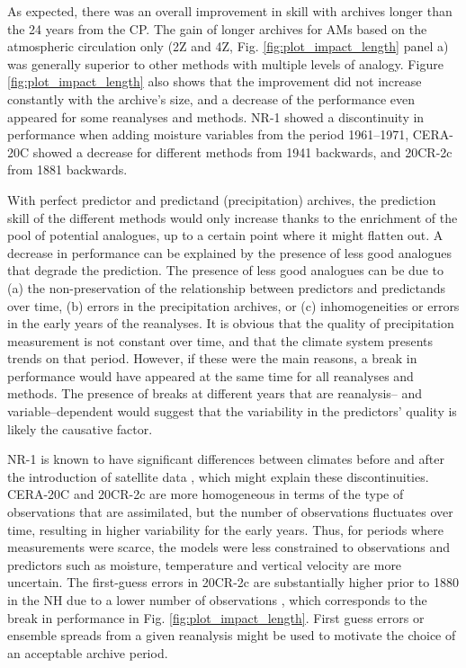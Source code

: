 \documentclass[smallextended]{svjour3}       %
\begin{document}
	As expected, there was an overall improvement in skill with archives longer than the 24 years from the CP. The gain of longer archives for AMs based on the atmospheric circulation only (2Z and 4Z, Fig. \ref{fig:plot_impact_length} panel a) was generally superior to other methods with multiple levels of analogy. Figure \ref{fig:plot_impact_length} also shows that the improvement did not increase constantly with the archive's size, and a decrease of the performance even appeared for some reanalyses and methods. NR-1 showed a discontinuity in performance when adding moisture variables from the period 1961--1971, CERA-20C showed a decrease for different methods from 1941 backwards, and 20CR-2c from 1881 backwards.
	
	With perfect predictor and predictand (precipitation) archives, the prediction skill of the different methods would only increase thanks to the enrichment of the pool of potential analogues, up to a certain point where it might flatten out. A decrease in performance can be explained by the presence of less good analogues that degrade the prediction. The presence of less good analogues can be due to (a) the non-preservation of the relationship between predictors and predictands over time, (b) errors in the precipitation archives, or (c) inhomogeneities or errors in the early years of the reanalyses. It is obvious that the quality of precipitation measurement is not constant over time, and that the climate system presents trends on that period. However, if these were the main reasons, a break in performance would have appeared at the same time for all reanalyses and methods. The presence of breaks at different years that are reanalysis-- and variable--dependent would suggest that the variability in the predictors' quality is likely the causative factor.
	
	NR-1 is known to have significant differences between climates before and after the introduction of satellite data \citep{Kistler2001}, which might explain these discontinuities. CERA-20C and 20CR-2c are more homogeneous in terms of the type of observations that are assimilated, but the number of observations fluctuates over time, resulting in higher variability for the early years. Thus, for periods where measurements were scarce, the models were less constrained to observations and predictors such as moisture, temperature and vertical velocity are more uncertain. The first-guess errors in 20CR-2c are substantially higher prior to 1880 in the NH due to a lower number of observations \citep{Compo2011}, which corresponds to the break in performance in Fig. \ref{fig:plot_impact_length}. First guess errors or ensemble spreads from a given reanalysis might be used to motivate the choice of an acceptable archive period.
	
\end{document}
